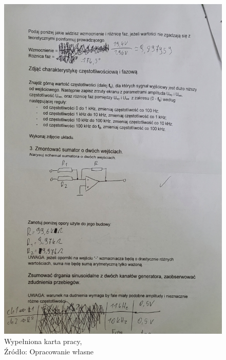 \documentclass{article}
\begin{document}
\begin{figure}[!ht]
\begin{minipage}{.5\textwidth}
          \includegraphics[scale=0.2]{grafiki/zdj2.jpg} 
          \caption{Wypełniona karta pracy,
          \\Źródło: Opracowanie własne}
      \end{minipage}
    \end{figure}
\end{document}
